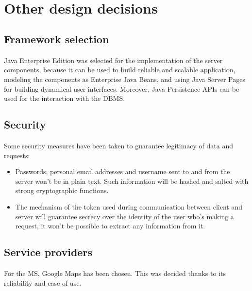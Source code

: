 		\section{Other design decisions}
			\subsection{Framework selection}
				\paragraph{}
					Java Enterprise Edition was selected for the implementation of the server components, because it can be used to build reliable and scalable application, modeling the components as Enterprise Java Beans, and using Java Server Pages for building dynamical user interfaces. Moreover, Java Persistence APIs can be used for the interaction with the DBMS.
			\subsection{Security}
				\paragraph{}
					Some security measures have been taken to guarantee legitimacy of data and requests:
						\begin{itemize}
							\item Passwords, personal email addresses and username sent to and from the server won't be in plain text. Such information will be hashed and salted with strong cryptographic functions.
							\item The mechanism of the token used during communication between client and server will guarantee secrecy over the identity of the user who's making a request, it won't be possible to extract any information from it. 
						\end{itemize}
			\subsection{Service providers}
				\paragraph{}
					For the MS, Google Maps has been chosen. This was decided thanks to its reliability and ease of use.